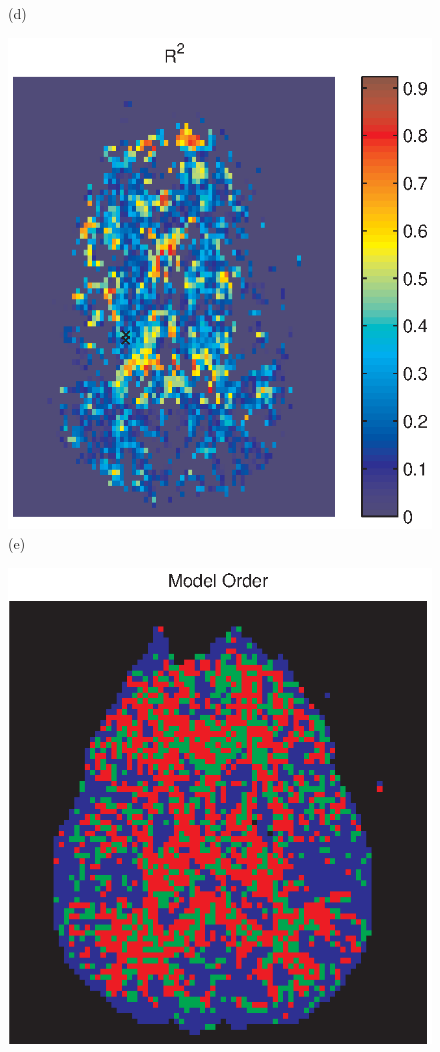 \documentclass[authoryear,preprint,12pt]{elsarticle}
\begin{document}
\begin{figure}[p]
\begin{center}
\begin{minipage}[]{.30\textwidth}
       (d)
      \end{minipage}
      \begin{minipage}[]{.30\textwidth}
      \centering
      \includegraphics[width=\textwidth]{rsq255.eps}
       (e)
      \end{minipage}
      \begin{minipage}[]{.30\textwidth}
      \centering
      \includegraphics[width=\textwidth]{modelorderchosen2ba.eps}

\end{minipage}
\end{center}
\end{figure}
\end{document}
